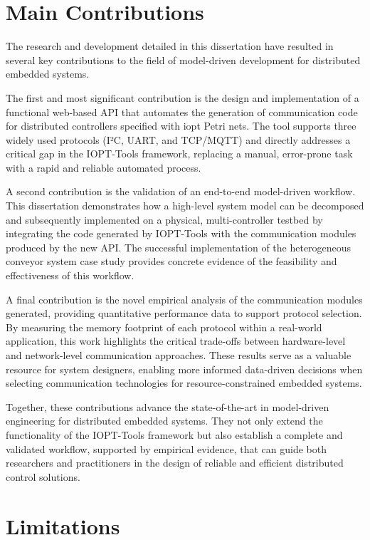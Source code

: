 \section{Main Contributions}
\label{sec:main_contributions}

The research and development detailed in this dissertation have resulted in several key contributions to the field of model-driven development for distributed embedded systems. 

The first and most significant contribution is the design and implementation of a functional web-based API that automates the generation of communication code for distributed controllers specified with \gls{iopt} Petri nets. The tool supports three widely used protocols (I²C, UART, and TCP/MQTT) and directly addresses a critical gap in the IOPT-Tools framework, replacing a manual, error-prone task with a rapid and reliable automated process.

A second contribution is the validation of an end-to-end model-driven workflow. This dissertation demonstrates how a high-level system model can be decomposed and subsequently implemented on a physical, multi-controller testbed by integrating the code generated by IOPT-Tools with the communication modules produced by the new API. The successful implementation of the heterogeneous conveyor system case study provides concrete evidence of the feasibility and effectiveness of this workflow.

A final contribution is the novel empirical analysis of the communication modules generated, providing quantitative performance data to support protocol selection. By measuring the memory footprint of each protocol within a real-world application, this work highlights the critical trade-offs between hardware-level and network-level communication approaches. These results serve as a valuable resource for system designers, enabling more informed data-driven decisions when selecting communication technologies for resource-constrained embedded systems.

Together, these contributions advance the state-of-the-art in model-driven engineering for distributed embedded systems. They not only extend the functionality of the IOPT-Tools framework but also establish a complete and validated workflow, supported by empirical evidence, that can guide both researchers and practitioners in the design of reliable and efficient distributed control solutions.


\section{Limitations}
\label{sec:limitations}

